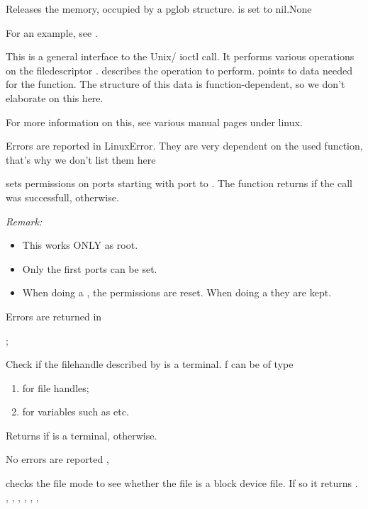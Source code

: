 

 {Releases the memory, occupied by a pglob structure.  is set to nil.}{None}
 {  }

For an example, see .

{
This is a general interface to the Unix/ \linux ioctl call.
It performs various operations on the filedescriptor .
 describes the operation to perform.
 points to data needed for the  function. 
The structure of this data is function-dependent, so we don't elaborate on
this here. 

For more information on this, see various manual pages under linux.
}
{
Errors are reported in LinuxError. They are very dependent on the used
function, that's why we don't list them here
}
{}



{
  sets permissions on  ports starting with port  to 
  . The function returns  if the call was successfull,
   otherwise.

{\em Remark:}
\begin{itemize}
\item This works ONLY as root.
\item Only the first  ports can be set.
\item When doing a , the permissions are reset. When doing a
 they are kept.
\end{itemize}
}{Errors are returned in }{}

;
{
Check if the filehandle described by  is a terminal.
f can be of type
\begin{enumerate}
\item {} for file handles;
\item {} for  variables such as  etc.
\end{enumerate}

Returns  if  is a terminal,  otherwise.
}
{No errors are reported}
{,}


{  checks the file mode  to see whether the file is a
block device file. If so it returns .
}
{,
 , 
 ,
 ,
 ,
 ,
}

